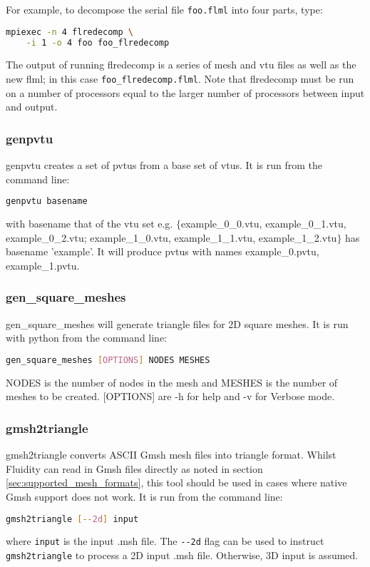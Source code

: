 For example, to decompose the serial file \lstinline+foo.flml+
into four parts, type:

\begin{lstlisting}[language=bash]
mpiexec -n 4 flredecomp \
    -i 1 -o 4 foo foo_flredecomp
\end{lstlisting}

The output of running flredecomp is a series of mesh and vtu files as well
as the new flml; in this case \lstinline+foo_flredecomp.flml+.
Note that flredecomp must be run on a number of processors equal to the larger number of processors between input and output.


\subsubsection{genpvtu}
\label{sec:genpvtu}
genpvtu creates a set of pvtus from a base set of vtus. It is run from the command line:
\begin{lstlisting}[language = Bash]
genpvtu basename 
\end{lstlisting}
with basename that of the vtu set e.g. $\{$example\_0\_0.vtu, example\_0\_1.vtu, example\_0\_2.vtu; example\_1\_0.vtu, example\_1\_1.vtu, example\_1\_2.vtu$\}$ has basename 'example'. It will produce pvtus with names example\_0.pvtu, example\_1.pvtu.


\subsubsection{gen\_square\_meshes}
\label{sec:gen_square_meshes}
gen\_square\_meshes will generate triangle files for 2D square meshes. It is run with python from the command line:
\begin{lstlisting}[language = Bash]
gen_square_meshes [OPTIONS] NODES MESHES 
\end{lstlisting} 
NODES is the number of nodes in the mesh and MESHES is the number of meshes to be created. [OPTIONS] are -h for help and -v for Verbose mode.


\subsubsection{gmsh2triangle}
\label{sec:gmsh2triangle}
gmsh2triangle converts ASCII Gmsh mesh files into triangle format. Whilst Fluidity
can read in Gmsh files directly as noted in section \ref{sec:supported_mesh_formats}, 
this tool should be used in cases where native Gmsh support does not work.
It is run from the command line:
\begin{lstlisting}[language = Bash]
gmsh2triangle [--2d] input
\end{lstlisting}
where \lstinline[language = Bash]+input+ is the input .msh file.
The \lstinline[language = Bash]+--2d+ flag can be used to instruct \lstinline+gmsh2triangle+
to process a 2D input .msh file. Otherwise, 3D input is assumed.

